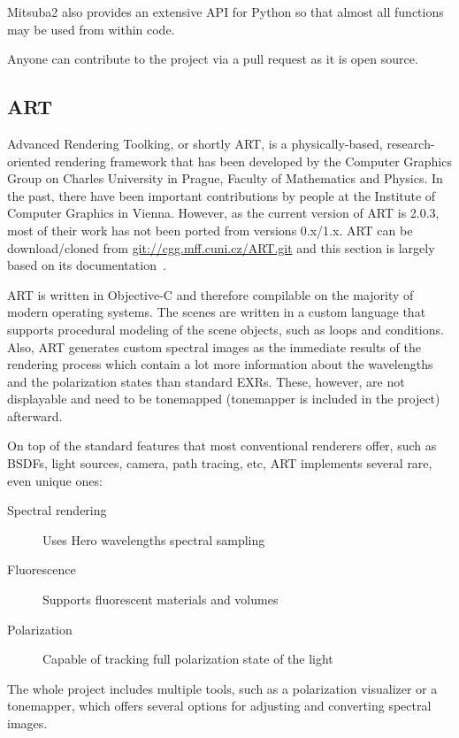 Mitsuba2 also provides an extensive API for Python so that almost all functions may be used from within code. 

Anyone can contribute to the project via a pull request as it is open source.

\subsection{ART}

Advanced Rendering Toolking, or shortly ART, is a physically-based, research-oriented rendering framework that has been developed by the Computer Graphics Group on Charles University in Prague, Faculty of Mathematics and Physics. In the past, there have been important contributions by people at the Institute of Computer Graphics in Vienna. However, as the current version of ART is 2.0.3, most of their work has not been ported from versions 0.x/1.x. ART can be download/cloned from \url{git://cgg.mff.cuni.cz/ART.git} and this section is largely based on its documentation~\cite{artDoc}.

ART is written in Objective-C and therefore compilable on the majority of modern operating systems. The scenes are written in a custom language that supports procedural modeling of the scene objects, such as loops and conditions. Also, ART generates custom spectral images as the immediate results of the rendering process which contain a lot more information about the wavelengths and the polarization states than standard EXRs. These, however, are not displayable and need to be tonemapped (tonemapper is included in the project) afterward.

On top of the standard features that most conventional renderers offer, such as BSDFs, light sources, camera, path tracing, etc, ART implements several rare, even unique ones:

\begin{description}
	\item[Spectral rendering] Uses Hero wavelengths spectral sampling
	\item[Fluorescence] Supports fluorescent materials and volumes
	\item[Polarization] Capable of tracking full polarization state of the light
\end{description}

The whole project includes multiple tools, such as a polarization visualizer or a tonemapper, which offers several options for adjusting and converting spectral images.

